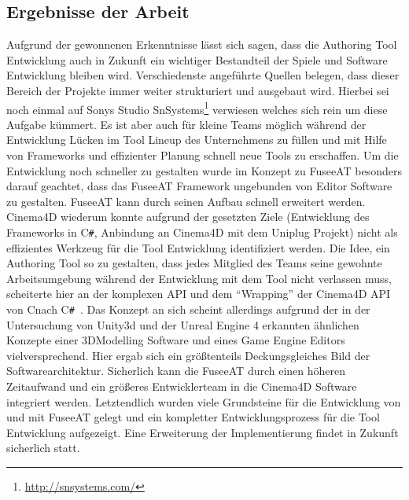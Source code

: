 \documentclass[pagesize, paper=a4, fontsize=12pt, titlepage=true, headings=small, headnosepline, abstractoff, liststotoc, nochapterprefix, plainheadsepline, twoside]{scrreprt}
\newcommand{\CS}{C\texttt{\#}}
\newcommand{\CSS}{C\texttt{\# }}
\newcommand{\CPP}{C\nolinebreak\hspace{-.05em}\raisebox{.4ex}{\tiny\bf +}\nolinebreak\hspace{-.10em}\raisebox{.4ex}{\tiny\bf +}}
\begin{document}

\subsection{Ergebnisse der Arbeit}
Aufgrund der gewonnenen Erkenntnisse lässt sich sagen, dass die Authoring Tool Entwicklung  auch in Zukunft ein wichtiger Bestandteil der Spiele und Software Entwicklung bleiben wird. Verschiedenste angeführte Quellen belegen, dass dieser Bereich der Projekte immer weiter strukturiert und ausgebaut wird. Hierbei sei noch einmal auf Sonys Studio SnSystems\footnote{\url{http://snsystems.com/}} verwiesen welches sich rein um diese Aufgabe kümmert. Es ist aber auch für kleine Teams möglich während der Entwicklung Lücken im Tool Lineup des Unternehmens zu füllen und mit Hilfe von Frameworks und effizienter Planung schnell neue Tools zu erschaffen.
Um die Entwicklung noch schneller zu gestalten wurde im Konzept zu FuseeAT besonders darauf geachtet, dass das FuseeAT Framework ungebunden von Editor Software zu gestalten. FuseeAT kann durch seinen Aufbau schnell erweitert werden. Cinema4D wiederum konnte aufgrund der gesetzten Ziele (Entwicklung des Frameworks in \CS, Anbindung an Cinema4D mit dem Uniplug Projekt) nicht als effizientes Werkzeug für die Tool Entwicklung identifiziert werden. Die Idee, ein Authoring Tool so zu gestalten, dass jedes Mitglied des Teams seine gewohnte Arbeitsumgebung während der Entwicklung mit dem Tool nicht verlassen muss, scheiterte hier an der komplexen API und dem “Wrapping” der Cinema4D API von \CPP nach \CSS. Das Konzept an sich scheint allerdings aufgrund der in der Untersuchung von Unity3d und der Unreal Engine 4 erkannten ähnlichen Konzepte einer 3DModelling Software und eines Game Engine Editors vielversprechend. Hier ergab sich ein größtenteils Deckungsgleiches Bild der Softwarearchitektur. Sicherlich kann die FuseeAT durch einen höheren Zeitaufwand und ein größeres Entwicklerteam in die Cinema4D Software integriert werden.
Letztendlich wurden viele Grundsteine für die Entwicklung von und mit FuseeAT gelegt und ein kompletter Entwicklungsprozess für die Tool Entwicklung aufgezeigt. Eine Erweiterung der Implementierung findet in Zukunft sicherlich statt.



\end{document}
